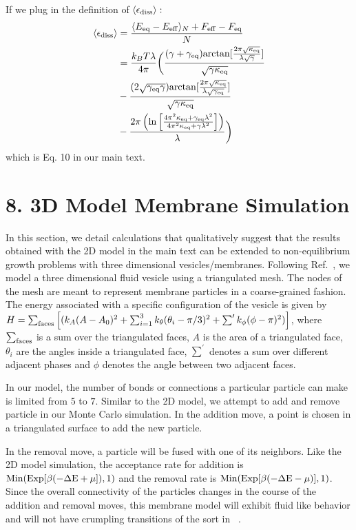 \documentclass[amsmath,preprintnumbers,10pt,nofootinbib,prl,twocolumn]{revtex4-1}
\begin{document}
If we plug in the definition of $\langle\epsilon_{\rm diss}\rangle:$
\begin{equation}
    \begin{split}
        \langle\epsilon_{\rm diss}\rangle&=\frac{\langle E_{\rm{eq}}-E_{\rm{eff}}\rangle_N+F_{\rm{eff}}-F_{\rm{eq}}}{N}\\
        &=\frac{k_BT\lambda}{4\pi}\biggl( \frac{(\gamma+\gamma_{\rm eq})\rm{arctan}[\frac{2\pi\sqrt{\kappa_{\rm eq}}}{\lambda\sqrt{\gamma}}]}{\sqrt{\gamma\kappa_{\rm eq}}}\\
        &- \frac{(2\sqrt{\gamma_{\rm eq}\gamma})\rm{arctan}[\frac{2\pi\sqrt{\kappa_{\rm eq}}}{\lambda\sqrt{\gamma_{\rm eq}}}]}{\sqrt{\gamma\kappa_{\rm eq}}} \\
        & -\frac{2\pi\left(\rm{ln}\left[\frac{4\pi^2\kappa_{\rm eq}+\gamma_{\rm eq}\lambda^2}{4\pi^2\kappa_{\rm eq}+\gamma\lambda^2}\right]\right)}{\lambda}\biggr)
    \end{split}
\end{equation}
which is Eq. 10 in our main text.
\section{8. 3D Model Membrane Simulation}

In this section, we detail calculations that qualitatively suggest that the results obtained with the 2D model in the main text can be extended to non-equilibrium growth problems with three dimensional vesicles/membranes. Following Ref.~\cite{Mahadevan2019}, we model a three dimensional fluid vesicle using a triangulated mesh. The nodes of the mesh are meant to represent membrane particles in a coarse-grained fashion. The energy associated with a specific configuration of the vesicle is given by  $H=\sum_{\rm faces}\left[ (k_A(A-A_0)^2 +\sum_{i=1}^3 k_\theta (\theta_i-\pi/3)^2 + \sum^\prime k_\phi (\phi-\pi)^2)\right]$, where $\sum_{\rm faces}$ is a sum over the triangulated faces, $A$ is the area of a triangulated face, $\theta_i$ are the angles inside a triangulated face,  $\sum^\prime$ denotes a sum over different adjacent phases and $\phi$ denotes the angle between two adjacent faces. 

In our model, the number of bonds or connections a particular particle can make is limited from $5$ to $7$.  Similar to the 2D model, we attempt to add and remove particle in our Monte Carlo simulation. In the addition move, a point is chosen in a triangulated surface to add the new particle.  

 In the removal move, a particle will be fused with one of its neighbors. Like the 2D model simulation, the acceptance rate for addition is $\rm{Min}(\rm{Exp}[\beta(-\Delta E +\mu]),1)$ and the removal rate is $\rm{Min}(\rm{Exp}[\beta(-\Delta E -\mu)],1)$. Since the overall connectivity of the particles changes in the course of the addition and removal moves, this membrane model will exhibit fluid like behavior and will not have crumpling transitions of the sort in ~\cite{Paulose2012}.
\end{document}
